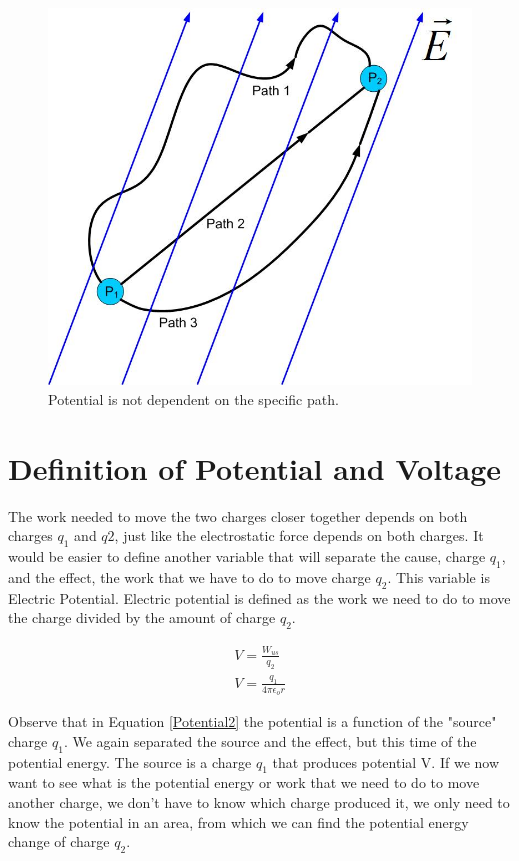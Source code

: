 \documentclass{ximera}
\begin{document}
\begin{figure}[htbp]
\begin{center}
\includegraphics[scale=0.5]{../jpg/workindependentofpath.jpg}
\end{center} 
\caption{Potential is not dependent on the specific path.}\label{PotentialWork}
\end{figure}


\section{Definition of Potential and Voltage}


The work needed to move the two charges closer together depends on both charges $q_1$ and $q2$, just like the electrostatic force depends on both charges. It would be easier to define another variable that will separate the cause, charge $q_1$, and the effect, the work that we have to do to move charge $q_2$. This variable is Electric Potential. Electric potential is defined as the work we need to do to move the charge divided by the amount of charge $q_2$.

\begin{eqnarray}
V=\frac{W_{us}}{q_2} \\
V=\frac{q_1}{4 \pi \epsilon_o r} \label{Potential2}
\end{eqnarray}

Observe that in Equation \ref{Potential2} the potential is a function of the "source" charge $q_1$. We again separated the source and the effect, but this time of the potential energy. The source is a charge $q_1$ that produces potential V. If we now want to see what is the potential energy or work that we need to do to move another charge, we don't have to know which charge produced it, we only need to know the potential in an area, from which we can find the potential energy change of charge $q_2$. 
\end{document}
